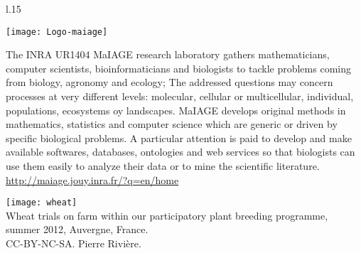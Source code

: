 \vfill


\begin{wrapfigure}{l}{.15\textwidth}
\begin{center} \vspace{-20pt}
\texttt{[image: Logo-maiage]}
\end{center} \vspace{-20pt}
\end{wrapfigure}
\noindent
The INRA UR1404 MaIAGE research laboratory gathers mathematicians, computer scientists, bioinformaticians and biologists to tackle problems coming from biology, agronomy and ecology; The addressed questions may concern processes at very different levels: molecular, cellular or multicellular, individual, populations, ecosystems oy landscapes. 
MaIAGE develops original methods in mathematics, statistics and computer science which are generic or driven by specific biological problems. A particular attention is paid to develop and make available softwares, databases, ontologies and web services so that biologists can use them easily to analyze their data or to mine the scientific literature.\\
\url{http://maiage.jouy.inra.fr/?q=en/home}



\newpage

\tableofcontents

\vfill

\begin{center}
\texttt{[image: wheat]} \\
Wheat trials on farm within our participatory plant breeding programme, summer 2012, Auvergne, France. \\
CC-BY-NC-SA. Pierre Rivière.
\end{center}

\newpage
\pagestyle{plain}
